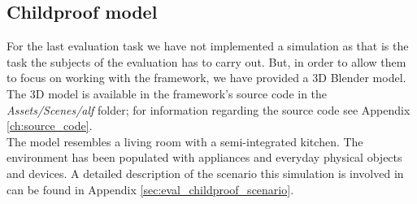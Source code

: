 \subsection{Childproof model} %
\label{subsec:impl_childproof_model}
For the last evaluation task we have not implemented a simulation as that is the task the subjects of the evaluation has to carry out. But, in order to allow them to focus on working with the framework, we have provided a 3D Blender model. The 3D model is available in the framework's source code in the \emph{Assets/Scenes/alf} folder; for information regarding the source code see Appendix \ref{ch:source_code}.\\

The model resembles a living room with a semi-integrated kitchen. The environment has been populated with appliances and everyday physical objects and devices. A detailed description of the scenario this simulation is involved in can be found in Appendix \ref{sec:eval_childproof_scenario}.

